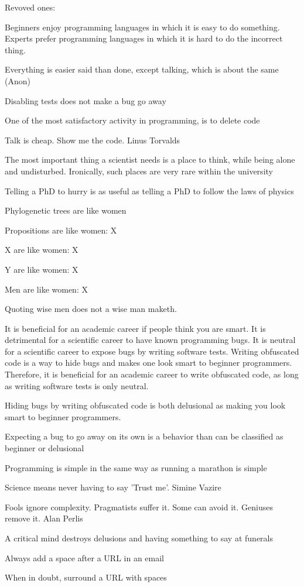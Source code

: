 \documentclass{dissertation}
\begin{document}
Revoved ones:
\item Beginners enjoy programming languages in which it is easy to do something.
      Experts prefer programming languages in which it is hard to do the incorrect thing.
\item Everything is easier said than done, except talking, which is about the same (Anon)
\item Disabling tests does not make a bug go away
\item One of the most satisfactory activity in programming, is to delete code
\item Talk is cheap. Show me the code. Linus Torvalds
\item The most important thing a scientist needs is a place to think, while
      being alone and undisturbed. Ironically, such places are very rare
      within the university
\item Telling a PhD to hurry is as useful as telling a PhD to follow the laws of physics
\item Phylogenetic trees are like women
\item Propositions are like women: X
\item X are like women: X
\item Y are like women: X
\item Men are like women: X
\item Quoting wise men does not a wise man maketh.
\item It is beneficial for an academic career if people think you are smart.
      It is detrimental for a scientific career to have known programming bugs.
      It is neutral for a scientific career to expose bugs by writing software tests.
      Writing obfuscated code is a way to hide bugs and makes one look smart to beginner programmers.
      Therefore, it is beneficial for an academic career to write obfuscated code,
      as long as writing software tests is only neutral.
\item Hiding bugs by writing obfuscated code is both delusional as making you look smart to beginner programmers.
\item Expecting a bug to go away on its own is a behavior than can be classified as beginner or delusional
\item Programming is simple in the same way as running a marathon is simple
\item Science means never having to say 'Trust me'. Simine Vazire
\item Fools ignore complexity. Pragmatists suffer it. Some can avoid it. Geniuses remove it. Alan Perlis
\item A critical mind destroys delusions and having something to say at funerals
\item Always add a space after a URL in an email
\item When in doubt, surround a URL with spaces
\end{document}
